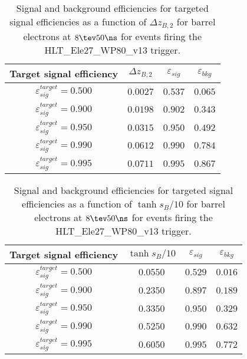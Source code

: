 \clearpage

\begin{table}[!bht]
  \begin{center}
    \begin{tabular}{cccc}
      \hline
      Target signal efficiency & $\Delta z_{B,2}$ & $\varepsilon_{sig}$ & $\varepsilon_{bkg}$ \\ 
      \hline
      $\varepsilon_{sig}^{target} = 0.500$ & $  0.0027$ & $0.537$ & $0.065$ \\
      $\varepsilon_{sig}^{target} = 0.900$ & $  0.0198$ & $0.902$ & $0.343$ \\
      $\varepsilon_{sig}^{target} = 0.950$ & $  0.0315$ & $0.950$ & $0.492$ \\
      $\varepsilon_{sig}^{target} = 0.990$ & $  0.0612$ & $0.990$ & $0.784$ \\
      $\varepsilon_{sig}^{target} = 0.995$ & $  0.0711$ & $0.995$ & $0.867$ \\
      \hline
    \end{tabular}
    \caption{Signal and background efficiencies for targeted signal efficiencies as a function of $\Delta z_{B,2}$ for barrel electrons at $8\tev 50\ns$ for events firing the HLT\_Ele27\_WP80\_v13 trigger.}
    \label{tab:eff_rej_z2B_beam_8_50_trigger_27_B}
  \end{center}
\end{table}

\clearpage

\begin{table}[!bht]
  \begin{center}
    \begin{tabular}{cccc}
      \hline
      Target signal efficiency & $\tanh{s_B/10}$ & $\varepsilon_{sig}$ & $\varepsilon_{bkg}$ \\ 
      \hline
      $\varepsilon_{sig}^{target} = 0.500$ & $  0.0550$ & $0.529$ & $0.016$ \\
      $\varepsilon_{sig}^{target} = 0.900$ & $  0.2350$ & $0.897$ & $0.189$ \\
      $\varepsilon_{sig}^{target} = 0.950$ & $  0.3350$ & $0.950$ & $0.329$ \\
      $\varepsilon_{sig}^{target} = 0.990$ & $  0.5250$ & $0.990$ & $0.632$ \\
      $\varepsilon_{sig}^{target} = 0.995$ & $  0.6050$ & $0.995$ & $0.772$ \\
      \hline
    \end{tabular}
    \caption{Signal and background efficiencies for targeted signal efficiencies as a function of $\tanh{s_B/10}$ for barrel electrons at $8\tev 50\ns$ for events firing the HLT\_Ele27\_WP80\_v13 trigger.}
    \label{tab:eff_rej_sB_beam_8_50_trigger_27_B}
  \end{center}
\end{table}


